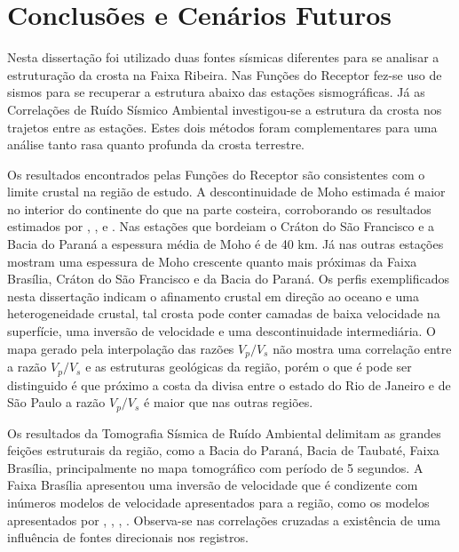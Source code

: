 \chapter{Conclusões e Cenários Futuros}

Nesta dissertação foi utilizado duas fontes sísmicas diferentes para se analisar a estruturação da crosta na Faixa Ribeira. Nas Funções do Receptor fez-se uso de sismos para se recuperar a estrutura abaixo das estações sismográficas. Já as Correlações de Ruído Sísmico Ambiental investigou-se a estrutura da crosta nos trajetos entre as estações. Estes dois métodos foram complementares para uma análise tanto rasa quanto profunda da crosta terrestre.

Os resultados encontrados pelas Funções do Receptor são consistentes com o limite crustal na região de estudo. A descontinuidade de Moho estimada é maior no interior do continente do que na parte costeira, corroborando os resultados estimados por \cite{sand_franca_crustal_2004}, \cite{Assumpcao_America_2013}, \cite{Assumpcao_Brazil_2013} e \cite{van_der_meijde_gravity_2013}. Nas estações que bordeiam o Cráton do São Francisco e a Bacia do Paraná a espessura média de Moho é de 40 km. Já nas outras estações mostram uma espessura de Moho crescente quanto mais próximas da Faixa Brasília, Cráton do São Francisco e da Bacia do Paraná. Os perfis exemplificados nesta dissertação indicam o afinamento crustal em direção ao oceano e uma heterogeneidade crustal, tal crosta pode conter camadas de baixa velocidade na superfície, uma inversão de velocidade e uma descontinuidade intermediária. O mapa gerado pela interpolação das razões $V_{p}/V_{s}$ não mostra uma correlação entre a razão $V_{p}/V_{s}$ e as estruturas geológicas da região, porém o que é pode ser distinguido é que próximo a costa da divisa entre o estado do Rio de Janeiro e de São Paulo a razão $V_{p}/V_{s}$ é maior que nas outras regiões.

Os resultados da Tomografia Sísmica de Ruído Ambiental delimitam as grandes feições estruturais da região, como a Bacia do Paraná, Bacia de Taubaté, Faixa Brasília, principalmente no mapa tomográfico com período de 5 segundos. A Faixa Brasília apresentou uma inversão de velocidade que é condizente com inúmeros modelos de velocidade apresentados para a região, como os modelos apresentados por \cite{sand_franca_crustal_2004}, \cite{dias_cario_crustal_2006}, \cite{flora_solon_ancient_2013}, \cite{Silva_2014}. Observa-se nas correlações cruzadas a existência de uma influência de fontes direcionais nos registros. 

